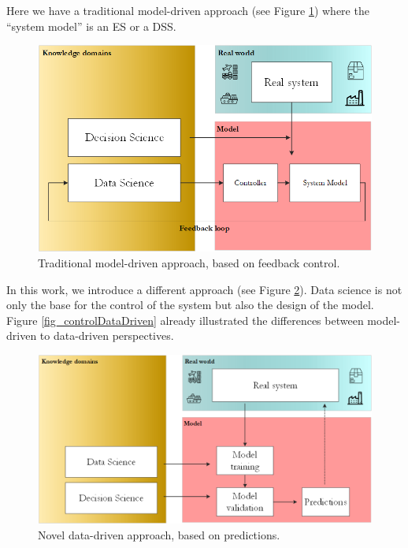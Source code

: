 Here we have a traditional model-driven approach (see Figure \ref{fig_controlAsIs}) where the “system model” is an ES or a DSS.

\begin{figure}[hbt!]
\centering
\includegraphics[width=1\textwidth]{SectionIntroduction/introduction_figures/fig_controlAsIs.png}
\captionsetup{type=figure}
\caption{Traditional model-driven approach, based on feedback control.}
\label{fig_controlAsIs}
\end{figure}

In this work, we introduce a different approach (see Figure \ref{fig_controlToBe}). Data science is not only the base for the control of the system but also the design of the model. Figure \ref{fig_controlDataDriven} already illustrated the differences between model-driven to data-driven perspectives.

\begin{figure}[hbt!]
\centering
\includegraphics[width=1\textwidth]{SectionIntroduction/introduction_figures/fig_controlToBe.png}
\captionsetup{type=figure}
\caption{Novel data-driven approach, based on predictions.}
\label{fig_controlToBe}
\end{figure}

